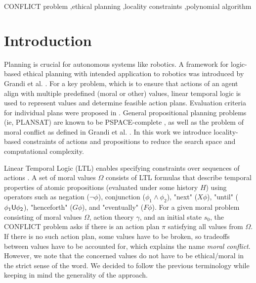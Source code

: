 \documentclass[a4paper,fleqn]{cas-dc}
\begin{document}
\begin{keywords}
CONFLICT problem \sep ethical planning \sep locality constraints \sep polynomial algorithm
\end{keywords}


\maketitle

\section{Introduction}

Planning is crucial for autonomous systems like robotics. A framework for logic-based ethical planning with intended application to robotics was introduced by Grandi et al. \cite{grandi2022logic}. For a key problem, which is to ensure that actions of an agent align with multiple predefined (moral or other) values, linear temporal logic is used to represent values and determine feasible action plans. Evaluation criteria for individual plans were proposed in \cite{grandi2023moral}. General propositional planning problems (ie, PLANSAT) are known to be PSPACE-complete \cite{BYLANDER1994165}, as well as the problem of moral conflict as defined in Grandi et al. \cite{grandi2022logic}. In this work we introduce locality-based constraints of actions and propositions to reduce the search space and computational complexity. 

Linear Temporal Logic (LTL) enables specifying constraints over sequences of actions \cite{10.5555/975331}.
A set of moral values $\Omega$ consists of LTL formulas \cite{4567924} that describe temporal properties of atomic propositions (evaluated under some history $H$) using operators such as negation ($\neg \phi$), conjunction ($\phi_1\land \phi_2$), "next" ($X\phi$), "until" ($\phi_1 \sf{U} \phi_2$), "henceforth" ($G\phi$), and "eventually" ($F\phi$). For a given moral problem consisting of moral values $\Omega$, action theory $\gamma$, and an initial state $s_0$, the CONFLICT problem asks if there is an action plan $\pi$ satisfying all values from $\Omega$. If there is no such action plan, some values have to be broken, so tradeoffs between values have to be accounted for, which explains the name {\it moral conflict}. However, we note that the concerned values do not have to be ethical/moral in the strict sense of the word. We decided to follow the previous terminology while keeping in mind the generality of the approach.
\end{document}
